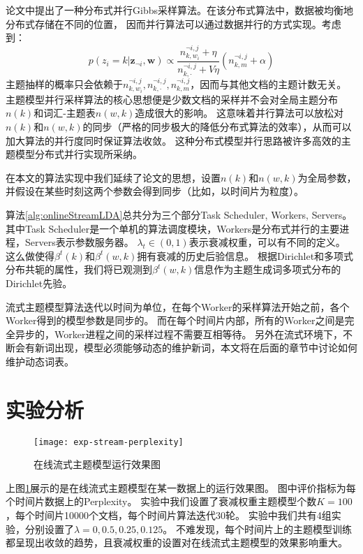 论文\cite{smola2010an}中提出了一种分布式并行Gibbs采样算法。在该分布式算法中，数据被均衡地分布式存储在不同的位置，
因而并行算法可以通过数据并行的方式实现。考虑到：
\begin{equation}
p( z_i = k | \mathbf{z}_{\neg i},  \mathbf{w}) 
 \propto \dfrac{ n_{k, w_i}^{\neg i,j} + \eta }{ n_{k, \cdot}^{\neg i,j} + V\eta}
(n_{k, m}^{\neg i,j} + \alpha)
\label{eq:sample-prob}
\end{equation}
主题抽样的概率只会依赖于$n_{k, w_i}^{\neg i,j}, n_{k, \cdot}^{\neg i,j}, n_{k, m}^{\neg i,j}$，因而与其他文档的主题计数无关。
主题模型并行采样算法的核心思想便是少数文档的采样并不会对全局主题分布$n(k)$和词汇-主题表$n(w, k)$造成很大的影响。
这意味着并行算法可以放松对$n(k)$和$n(w, k)$的同步（严格的同步极大的降低分布式算法的效率），从而可以加大算法的并行度同时保证算法收敛。
这种分布式模型并行思路被许多高效的主题模型分布式并行实现所采纳。

在本文的算法实现中我们延续了论文\cite{smola2010an}的思想，设置$n(k)$和$n(w, k)$为全局参数，
并假设在某些时刻这两个参数会得到同步（比如，以时间片为粒度）。

算法\ref{alg:onlineStreamLDA}总共分为三个部分Task Scheduler, Workers, Servers。
其中Task Scheduler是一个单机的算法调度模块，Workers是分布式并行的主要进程，Servers表示参数服务器。
$\lambda_t \in (0, 1)$表示衰减权重，可以有不同的定义。
这么做使得$\beta^t(k)$和$\beta^t(w, k)$拥有衰减的历史后验信息。
根据Dirichlet和多项式分布共轭的属性，我们将已观测到$\beta^t(w, k)$信息作为主题生成词多项式分布的Dirichlet先验。

流式主题模型算法迭代以时间为单位，在每个Worker的采样算法开始之前，各个Worker得到的模型参数是同步的。
而在每个时间片内部，所有的Worker之间是完全异步的，Worker进程之间的采样过程不需要互相等待。
另外在流式环境下，不断会有新词出现，模型必须能够动态的维护新词，本文将在后面的章节中讨论如何维护动态词表。

\section{实验分析}

\begin{figure}[htb]\centering
  \texttt{[image: exp-stream-perplexity]}
  \caption{在线流式主题模型运行效果图}
  \label{fig:exp-stream-perplexity}       %
\end{figure}

上图\ref{fig:exp-stream-perplexity}展示的是在线流式主题模型在某一数据上的运行效果图。
图中评价指标为每个时间片数据上的Perplexity。
实验中我们设置了衰减权重主题模型个数$K = 100$，每个时间片10000个文档，每个时间片算法迭代30轮。
实验中我们共有4组实验，分别设置了$\lambda = 0, 0.5, 0.25, 0.125$。
不难发现，每个时间片上的主题模型训练都呈现出收敛的趋势，且衰减权重的设置对在线流式主题模型的效果影响重大。

